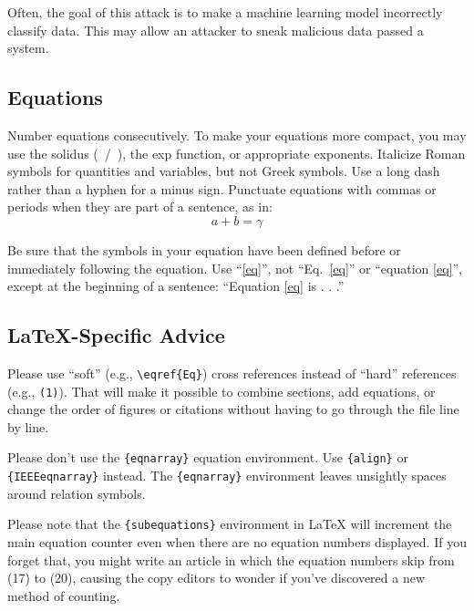 \documentclass[11pt,conference]{IEEEtran}
\begin{document}
Often, the goal of this
attack is to make a machine learning model incorrectly classify data. This may
allow an attacker to sneak malicious data passed a system.

\subsection{}

\subsection{Equations}
Number equations consecutively. To make your 
equations more compact, you may use the solidus (~/~), the exp function, or 
appropriate exponents. Italicize Roman symbols for quantities and variables, 
but not Greek symbols. Use a long dash rather than a hyphen for a minus 
sign. Punctuate equations with commas or periods when they are part of a 
sentence, as in:
\begin{equation}
a+b=\gamma\label{eq}
\end{equation}

Be sure that the 
symbols in your equation have been defined before or immediately following 
the equation. Use ``\eqref{eq}'', not ``Eq.~\eqref{eq}'' or ``equation \eqref{eq}'', except at 
the beginning of a sentence: ``Equation \eqref{eq} is . . .''

\subsection{\LaTeX-Specific Advice}

Please use ``soft'' (e.g., \verb|\eqref{Eq}|) cross references instead
of ``hard'' references (e.g., \verb|(1)|). That will make it possible
to combine sections, add equations, or change the order of figures or
citations without having to go through the file line by line.

Please don't use the \verb|{eqnarray}| equation environment. Use
\verb|{align}| or \verb|{IEEEeqnarray}| instead. The \verb|{eqnarray}|
environment leaves unsightly spaces around relation symbols.

Please note that the \verb|{subequations}| environment in {\LaTeX}
will increment the main equation counter even when there are no
equation numbers displayed. If you forget that, you might write an
article in which the equation numbers skip from (17) to (20), causing
the copy editors to wonder if you've discovered a new method of
counting.
\end{document}
